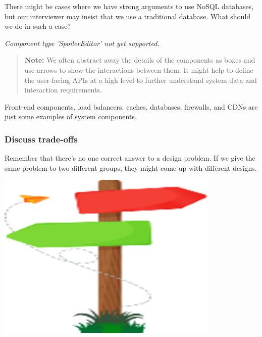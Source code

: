 There might be cases where we have strong arguments to use NoSQL databases, but our interviewer may insist that we use a traditional database. What should we do in such a case?

\textit{Component type 'SpoilerEditor' not yet supported.}

\begin{quote}
\textbf{Note:} We often abstract away the details of the components as boxes and use arrows to show the interactions between them. It might help to define the user-facing APIs at a high level to further understand system data and interaction requirements.
\end{quote}
Front-end components, load balancers, caches, databases, firewalls, and CDNs are just some examples of system components.

\subsubsection{Discuss trade-offs}\label{5XU12bEjL0Oy6BYkgsh3Q}

\noindent
\begin{minipage}[t]{0.48\textwidth}
Remember that there's no one correct answer to a design problem. If we give the same problem to two different groups, they might come up with different designs.
\end{minipage}
\hfill
\begin{minipage}[t]{0.48\textwidth}
\includegraphics[width=0.8\textwidth]{Images/chapter_1/section_6043988183744512/4518944573095936.png}
\end{minipage}

